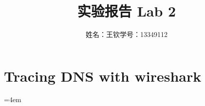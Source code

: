 \documentclass[a4paper]{article}
\begin{document}
\title{实验报告 Lab 2}
\author{姓名：王钦\quad 学号：13349112}
\date{}
\maketitle

\section*{ Tracing DNS with wireshark}
\hangindent=4em 
\end{document}
